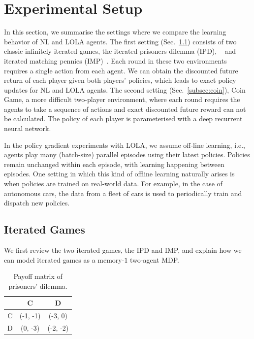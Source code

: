 \section{Experimental Setup}
\label{sec:setting}
In this section, we summarise the settings where we compare the learning behavior of NL and LOLA agents. The first setting (Sec.~\ref{subsec:iterated}) consists of two classic infinitely iterated games, the iterated prisoners dilemma (IPD), ~\cite{luce1957games} and iterated matching pennies (IMP)~\cite{lee1967application}. Each round in these two environments requires a single action from each agent. We can obtain the discounted future return of each player given both players' policies, which leads to exact policy updates for NL and LOLA agents. The second setting (Sec.~\ref{subsec:coin}), Coin Game, a more difficult two-player environment, where each round requires the agents to take a sequence of actions and exact discounted future reward can not be calculated. The policy of each player is parameterised with a deep recurrent neural network.

In the policy gradient experiments with LOLA, we assume off-line learning, i.e., agents play many (batch-size) parallel episodes using their latest policies. Policies remain unchanged within each episode, with learning happening between episodes. One setting in which this kind of offline learning naturally arises is when policies are trained on real-world data. For example, in the case of autonomous cars, the data from a fleet of cars is used to periodically train and dispatch new policies. 

\subsection{Iterated Games}
\label{subsec:iterated}
We first review the two iterated games, the IPD and IMP, and explain how we can model iterated games as a memory-$1$ two-agent MDP.

\begin{table}[h!]
\begin{center}
\begin{tabular}{c|c|c}
\hline
 & C & D \\
\hline
C & (-1, -1) & (-3, 0) \\
\hline
D & (0, -3) & (-2, -2)  \\
\hline
\end{tabular}
\end{center}
\caption{Payoff matrix of prisoners' dilemma.}
\label{tab:payoff}
\vspace{-3ex}
\end{table}

